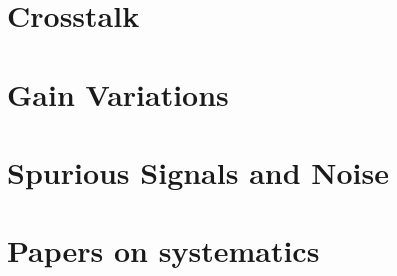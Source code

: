 \documentclass[
12pt, %
letterpaper, %
oneside, %
headinclude,footinclude, %
BCOR5mm, %
]{scrartcl}
\begin{document}
\section{Crosstalk}




\section{Gain Variations}






\section{Spurious Signals and Noise}






\section{Papers on systematics}




 


\renewcommand{\refname}{\spacedlowsmallcaps{References}} %


\end{document}
